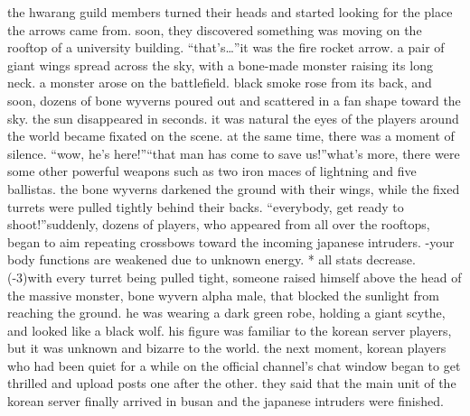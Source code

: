 the hwarang guild members turned their heads and started looking for the place the arrows came from.
 soon, they discovered something was moving on the rooftop of a university building.
“that’s…”it was the fire rocket arrow.
a pair of giant wings spread across the sky, with a bone-made monster raising its long neck.
 a monster arose on the battlefield.
 black smoke rose from its back, and soon, dozens of bone wyverns poured out and scattered in a fan shape toward the sky.
 the sun disappeared in seconds.
it was natural the eyes of the players around the world became fixated on the scene.
at the same time, there was a moment of silence.
“wow, he’s here!”“that man has come to save us!”what’s more, there were some other powerful weapons such as two iron maces of lightning and five ballistas.
the bone wyverns darkened the ground with their wings, while the fixed turrets were pulled tightly behind their backs.
“everybody, get ready to shoot!”suddenly, dozens of players, who appeared from all over the rooftops, began to aim repeating crossbows toward the incoming japanese intruders.
-your body functions are weakened due to unknown energy.
* all stats decrease.
 (-3)with every turret being pulled tight, someone raised himself above the head of the massive monster, bone wyvern alpha male, that blocked the sunlight from reaching the ground.
he was wearing a dark green robe, holding a giant scythe, and looked like a black wolf.
his figure was familiar to the korean server players, but it was unknown and bizarre to the world.
the next moment, korean players who had been quiet for a while on the official channel’s chat window began to get thrilled and upload posts one after the other.
they said that the main unit of the korean server finally arrived in busan and the japanese intruders were finished.


 